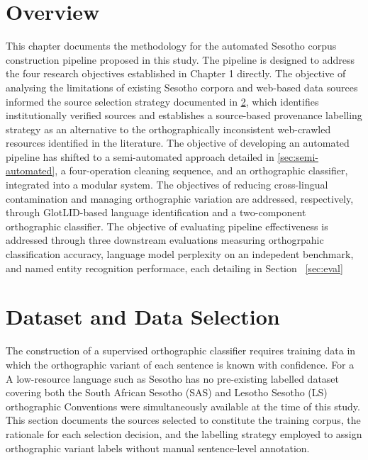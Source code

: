\documentclass[11pt,a4paper]{article}
\begin{document}
\maketitle

\section{Overview}
This chapter documents the methodology for the automated Sesotho corpus construction pipeline proposed in this study. The pipeline is designed to address the four research objectives established in Chapter 1 directly. The objective of analysing the limitations of existing Sesotho corpora and web-based data sources informed the source selection strategy documented in \ref{sec:data_selection}, which identifies institutionally verified sources and establishes a source-based provenance labelling strategy as an alternative to the orthographically inconsistent web-crawled resources identified in the literature. The objective of developing an automated pipeline has shifted to a semi-automated approach detailed in \ref{sec:semi-automated}, a four-operation cleaning sequence, and an orthographic classifier, integrated into a modular system. The objectives of reducing cross-lingual contamination and managing orthographic variation are addressed, respectively, through GlotLID-based language identification and a two-component orthographic classifier. The objective of evaluating pipeline effectiveness is addressed through three downstream evaluations measuring orthogrpahic classification accuracy, language model perplexity on an indepedent benchmark, and named entity recognition performace, each detailing in Section ~\ref{sec:eval}

\section{Dataset and Data Selection}
\label{sec:data_selection}

The construction of a supervised orthographic classifier requires training data in
which the orthographic variant of each sentence is known with confidence. For a
A low-resource language such as Sesotho has no pre-existing labelled dataset covering
both the South African Sesotho (SAS) and Lesotho Sesotho (LS) orthographic
Conventions were simultaneously available at the time of this study. This section
documents the sources selected to constitute the training corpus, the rationale
for each selection decision, and the labelling strategy employed to assign
orthographic variant labels without manual sentence-level annotation.
\end{document}
